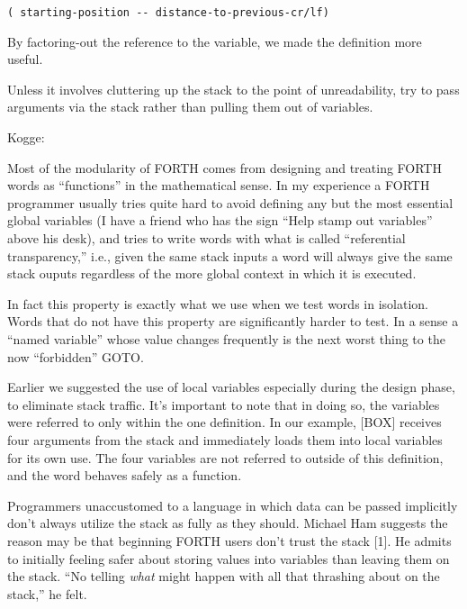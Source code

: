 \begin{verbatim}
( starting-position -- distance-to-previous-cr/lf)
\end{verbatim}

By factoring-out the reference to the variable, we made the definition
more useful.

\begin{tip}
Unless it involves cluttering up the stack to the point of unreadability, try
to pass arguments via the stack rather than pulling them out of variables.
\end{tip}
\bigskip
\blackline{2ex}
\noindent Kogge:
\begin{tfquot}
Most of the modularity of FORTH comes from designing and treating
FORTH words as ``functions'' in the mathematical sense. In my experience
a FORTH programmer usually tries quite hard to avoid defining any but
the most essential global variables (I have a friend who has the sign ``Help
stamp out variables'' above his desk), and tries to write words with what is
called ``referential transparency,'' i.e., given the same stack inputs a word
will always give the same stack ouputs regardless of the more global
context in which it is executed.

In fact this property is exactly what we use when we test words in isolation.
Words that do not have this property are significantly harder to test. In a
sense a ``named variable'' whose value changes frequently is the next worst
thing to the now ``forbidden'' GOTO.
\end{tfquot}
\blackline{1ex}


Earlier we suggested the use of local variables especially during the
design phase, to eliminate stack traffic. It's important to note that in
doing so, the variables were referred to only within the one definition. In
our example, [BOX] receives four arguments from the stack and immediately
loads them into local variables for its own use. The four variables are not
referred to outside of this definition, and the word behaves safely as a
function.

Programmers unaccustomed to a language in which data can be
passed implicitly don't always utilize the stack as fully as they should.
Michael Ham suggests the reason may be that beginning FORTH users
don't trust the stack [1]. He admits to initially feeling safer about storing
values into variables than leaving them on the stack. ``No telling \emph{what}
might happen with all that thrashing about on the stack,'' he felt.

